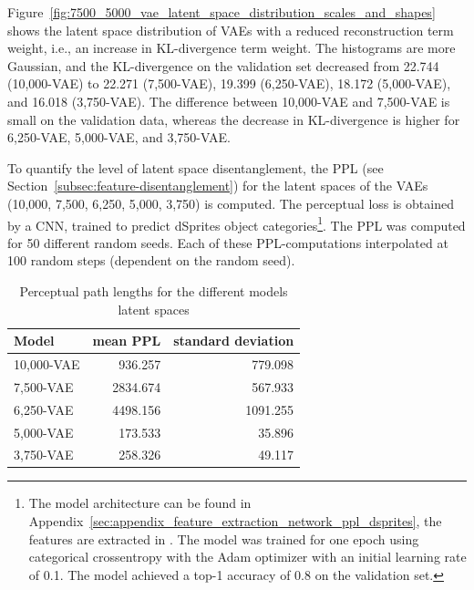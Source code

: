 Figure~\ref{fig:7500_5000_vae_latent_space_distribution_scales_and_shapes} shows the latent space distribution of \acp{VAE} with a reduced reconstruction term weight, i.e., an increase in \ac{KL-divergence} term weight.
The histograms are more Gaussian, and the \ac{KL-divergence} on the validation set decreased from 22.744 (10,000-\ac{VAE}) to 22.271 (7,500-\ac{VAE}), 19.399 (6,250-\ac{VAE}), 18.172 (5,000-\ac{VAE}), and 16.018 (3,750-\ac{VAE}).
The difference between 10,000-\ac{VAE} and 7,500-\ac{VAE} is small on the validation data, whereas the decrease in \ac{KL-divergence} is higher for 6,250-\ac{VAE}, 5,000-\ac{VAE}, and 3,750-\ac{VAE}.

To quantify the level of latent space disentanglement, the \ac{PPL} (see Section~\ref{subsec:feature-disentanglement}) for the latent spaces of the \acp{VAE} (10,000, 7,500, 6,250, 5,000, 3,750) is computed.
The perceptual loss is obtained by a \ac{CNN}, trained to predict dSprites object categories\footnote{The model architecture can be found in Appendix~\ref{sec:appendix_feature_extraction_network_ppl_dsprites}, the features are extracted in . The model was trained for one epoch using categorical crossentropy with the Adam optimizer with an initial learning rate of 0.1. The model achieved a top-1 accuracy of 0.8 on the validation set.}.
The \ac{PPL} was computed for 50 different random seeds.
Each of these \ac{PPL}-computations interpolated at 100 random steps (dependent on the random seed).

\begin{table}
    \centering
    \begin{tabular}{lrr}
        \toprule
        Model           & mean \ac{PPL} & standard deviation \\
        \midrule
        10,000-\ac{VAE} & 936.257       & 779.098            \\
        7,500-\ac{VAE}  & 2834.674      & 567.933            \\
        6,250-\ac{VAE}  & 4498.156      & 1091.255           \\
        5,000-\ac{VAE}  & 173.533       & 35.896             \\
        3,750-\ac{VAE}  & 258.326       & 49.117             \\
        \bottomrule
    \end{tabular}
    \caption[dSprites-VAEs: Perceptual Path Lengths]{Perceptual path lengths for the different models latent spaces}
    \label{tab:ppl-dsprites}
\end{table}

